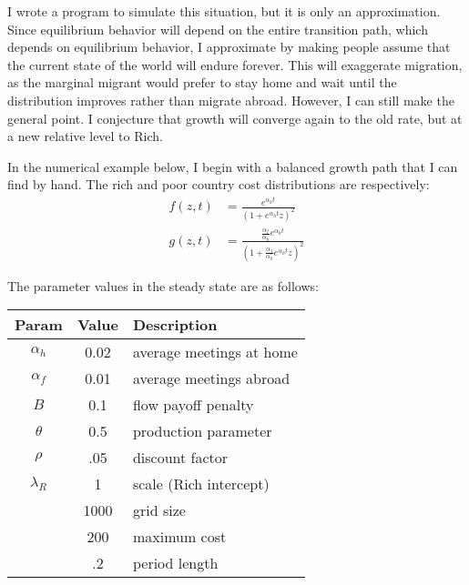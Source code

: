 \documentclass[12pt]{article}
\begin{document}
I wrote a program to simulate this situation, but it is only an approximation.  Since equilibrium behavior will depend on the entire transition path, which depends on equilibrium behavior, I approximate by making people assume that the current state of the world will endure forever.  This will exaggerate migration, as the marginal migrant would prefer to stay home and wait until the distribution improves rather than migrate abroad.  However, I can still make the general point.  I conjecture that growth will converge again to the old rate, but at a new relative level to Rich.  

In the numerical example below, I begin with a balanced growth path that I can find by hand.  The rich and poor country cost distributions are respectively:
\begin{align}
    f(z,t) &= \frac{e^{\alpha_h t}}{(1 + e^{\alpha_h t} z)^2} \\
    g(z,t) &= \frac{\frac{\alpha_f}{\alpha_h} e^{\alpha_h t}}{(1 + \frac{\alpha_f}{\alpha_h} e^{\alpha_h t} z)^2} 
\end{align}

The parameter values in the steady state are as follows:
\begin{table}[h]
    \centering
    \begin{tabular}{|c|c|l|}
        \hline
        Param       & Value & Description\\
        \hline
        $\alpha_h$  & 0.02  & average meetings at home\\
        \hline
        $\alpha_f$  & 0.01  & average meetings abroad\\
        \hline
        $B$         & 0.1   & flow payoff penalty\\
        \hline
        $\theta$    & 0.5   & production parameter\\
        \hline
        $\rho$      & .05   & discount factor\\
        \hline
        $\lambda_R$ & 1     & scale (Rich intercept)\\
        \hline
                    & 1000  & grid size\\
        \hline
                    & 200   & maximum cost\\
        \hline
                    & .2    & period length\\
        \hline

    \end{tabular}
\end{table}
\end{document}
